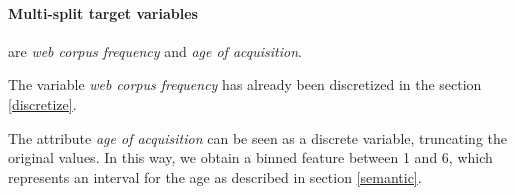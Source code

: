 \documentclass[a4paper,11pt,dvipsnames]{article}
\begin{document}
   \begin{minipage}{0.48\linewidth}
    \centering
        \begin{table}[H]

    \centering
            \caption{Score values of KNN}    \label{tab:knn_scores}

    \end{table}
\end{minipage}


\paragraph{Multi-split target variables} are \textit{web corpus frequency} and \textit{age of acquisition}. 

The variable \textit{web corpus frequency} has already been discretized in the section \ref{discretize}.

The attribute \textit{age of acquisition} can be seen as a discrete variable, truncating the original values. In this way, we obtain a binned feature between 1 and 6, which represents an interval for the age as described in section \ref{semantic}.
\end{document}
